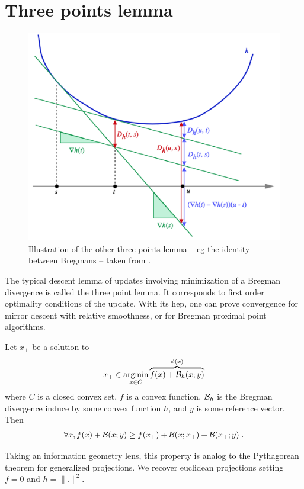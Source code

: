 \documentclass{article}
\begin{document}
\section{Three points lemma}
\label{app:3points}

\begin{figure}[ht]
	\centering
	\includegraphics[width=.7\textwidth]{figs/3pointslemma}
	\caption{Illustration of the other three points lemma -- eg the identity between Bregmans -- taken from \citet{eckstein1998approximate}.}
	\label{fig:3pointslemma}
\end{figure}

The typical descent lemma of updates involving minimization of a Bregman divergence is called the three point lemma. 
It corresponds to first order optimality conditions of the update.
With its hep, one can prove convergence for mirror descent with relative smoothness, or for Bregman proximal point algorithms.

\begin{lemma}
Let $x_+$ be a solution to 
\begin{align}
	x_+ \in \operatorname*{argmin}	_{x\in C} \overbrace{f(x) + {\mathcal B}_h(x ; y)}^{\phi(x)}
\end{align}
where $C$ is a closed convex set, $f$ is a convex function, ${\mathcal B}_h$ is the Bregman divergence induce by some convex function $h$, and $y$ is some reference vector. Then 
\begin{align}
	\forall x, f(x) + {\mathcal B}(x ;y) \geq f(x_+) + {\mathcal B}(x ; x_+) +{\mathcal B}(x_+ ; y) \; .
\end{align}
\end{lemma}

Taking an information geometry lens, this property is analog to the Pythagorean theorem for generalized projections.
We recover euclidean projections setting $f=0$ and $h=\|.\|^2$.
\end{document}
